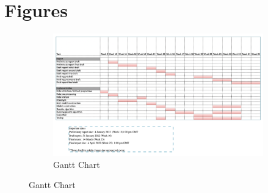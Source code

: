 \documentclass[11pt, natbib=false]{article}
\begin{document}
\section{Figures}
\begin{figure}[h!]
  \centering
  \begin{subfigure}[b]{0.7\linewidth}
    \caption{Gantt Chart}
    \includegraphics[width=\linewidth]{./gantt.png}
  \end{subfigure}


\end{figure}
\end{document}
